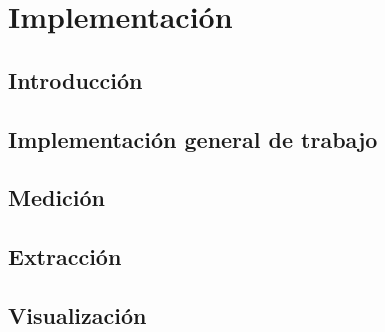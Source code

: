 \chapter{Implementación}
\section{Introducción}
\section{Implementación general de trabajo}
\section{Medición}
\section{Extracción}
\section{Visualización}
